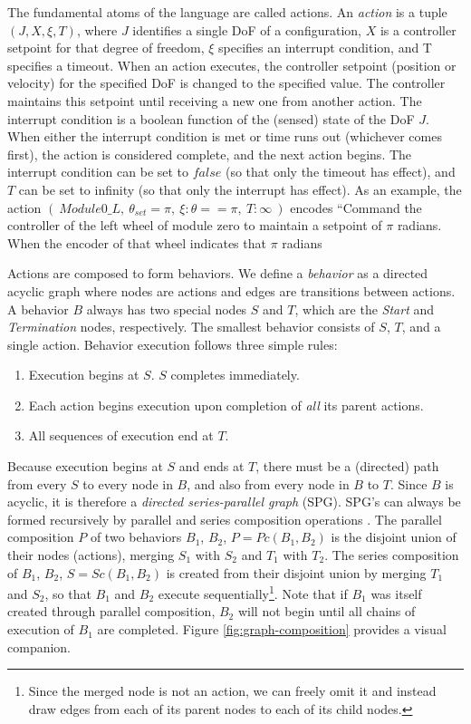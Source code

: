 \documentclass[conference]{IEEEtran}
\theoremstyle{definition}
\begin{document}
 The fundamental atoms of the language are called actions.  An \textit{action} is a tuple \(
(J, X, \xi, T)\), where \(J\) identifies a single DoF of a configuration, \(X\) is a
controller setpoint for that degree of freedom, \(\xi\) specifies an interrupt
condition, and T specifies a timeout. When an action executes, the controller
setpoint (position or velocity) for the specified DoF is changed to the specified
value. The controller maintains this setpoint until receiving a new one from another
action. The interrupt condition is a boolean function of the (sensed) state of the DoF \(J\).
When either the interrupt condition is met or time runs out (whichever comes
first), the action is considered complete, and the next action  begins. The
interrupt condition can be set to \(false\) (so that only the timeout has effect),
and \(T\) can be set to infinity (so that only the interrupt has effect). As an example,
the action \((~Module0\_L,~ \theta_{set}=\pi,~ \xi:\theta==\pi,~T:\infty~)\) encodes
``Command the controller of the left wheel of module zero to maintain a setpoint
of \(\pi\) radians.  When the encoder of that wheel indicates that \(\pi\) radians
 
Actions are composed to form behaviors. We define a \textit{behavior} as a directed acyclic graph where nodes are
actions and edges are transitions between actions.  A behavior \(B\) always has
two special nodes \(S\) and \(T\), which are the \textit{Start} and
\textit{Termination} nodes, respectively.  The smallest behavior consists of
\(S\), \(T\), and a single action.  Behavior execution follows three simple
rules:

\begin{enumerate}
\item Execution begins at \(S\).  \(S\) completes immediately.
\item Each action begins execution upon completion of \textit{all} its parent actions.
\item All sequences of execution end at \(T\).
\end{enumerate}

Because execution begins at \(S\) and ends at \(T\), there must be a (directed)
path from every \(S\) to every node in \(B\), and also from every node in \(B\)
to \(T\). Since \(B\) is acyclic, it is therefore a \textit{directed series-parallel graph} (SPG).
SPG's can always be formed recursively by parallel and series composition
operations \cite{valdes1979recognition}. The parallel composition \(P\) of two behaviors \(B_1\),
\(B_2\), \(P = Pc(B_1, B_2)\) is the disjoint union of their nodes (actions),
merging \(S_1\) with \(S_2\) and \(T_1\) with \(T_2\). The series composition
of \(B_1\), \(B_2\), \(S = Sc(B_1, B_2)\) is created from their disjoint union
by merging \(T_1\) and \(S_2\), so that \(B_1\) and \(B_2\) execute
sequentially\footnote{Since the merged node is not an action, we can freely
omit it and instead draw edges from each of its parent nodes to each of its
child nodes.}.  Note that if \(B_1\) was itself created through parallel
composition, \(B_2\) will not begin until all chains of execution of \(B_1\)
are completed. Figure \ref{fig:graph-composition} provides a visual companion.
\end{document}
